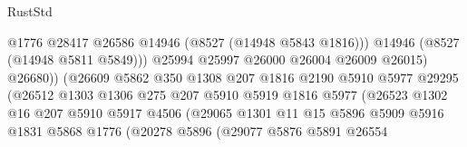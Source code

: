 \begin{lexlean}{RustStd}
\begin{coremodule}
                                            @1776
                                            @28417
                                            @26586
                                            @14946
                                            (@8527 (@14948 @5843 @1816)))
                                          @14946
                                          (@8527 (@14948 @5811 @5849)))
                                        @25994
                                        @25997
                                        @26000
                                        @26004
                                        @26009
                                        @26015)
                                      @26680))
                                  (@26609
                                    @5862
                                    @350
                                    @1308
                                    @207
                                    @1816
                                    @2190
                                    @5910
                                    @5977
                                    @29295
                                    (@26512
                                      @1303
                                      @1306
                                      @275
                                      @207
                                      @5910
                                      @5919
                                      @1816
                                      @5977
                                      (@26523
                                        @1302
                                        @16
                                        @207
                                        @5910
                                        @5917
                                        @4506
                                        (@29065
                                          @1301
                                          @11
                                          @15
                                          @5896
                                          @5909
                                          @5916
                                          @1831
                                          @5868
                                          @1776
                                          (@20278
                                            @5896
                                            (@29077
                                              @5876
                                              @5891
                                              @26554

\end{coremodule}
\end{lexlean}
